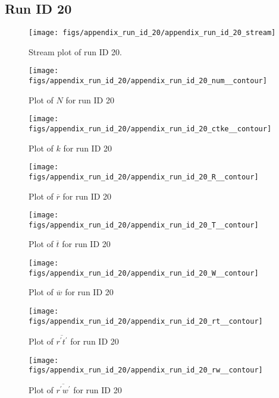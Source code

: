 \subsection{Run ID 20}
\begin{figure}[H]
\centering
\texttt{[image: figs/appendix\_run\_id\_20/appendix\_run\_id\_20\_stream]}
\caption{Stream plot of run ID 20.}
\label{fig:appendix_run_id_20_stream}
\end{figure}


\begin{figure}[H]
\centering
\texttt{[image: figs/appendix\_run\_id\_20/appendix\_run\_id\_20\_num\_\_contour]}
\caption{Plot of $N$ for run ID 20}
\label{fig:appendix_run_id_20_num__contour}
\end{figure}


\begin{figure}[H]
\centering
\texttt{[image: figs/appendix\_run\_id\_20/appendix\_run\_id\_20\_ctke\_\_contour]}
\caption{Plot of $k$ for run ID 20}
\label{fig:appendix_run_id_20_ctke__contour}
\end{figure}


\begin{figure}[H]
\centering
\texttt{[image: figs/appendix\_run\_id\_20/appendix\_run\_id\_20\_R\_\_contour]}
\caption{Plot of $\overline{r}$ for run ID 20}
\label{fig:appendix_run_id_20_R__contour}
\end{figure}


\begin{figure}[H]
\centering
\texttt{[image: figs/appendix\_run\_id\_20/appendix\_run\_id\_20\_T\_\_contour]}
\caption{Plot of $\overline{t}$ for run ID 20}
\label{fig:appendix_run_id_20_T__contour}
\end{figure}


\begin{figure}[H]
\centering
\texttt{[image: figs/appendix\_run\_id\_20/appendix\_run\_id\_20\_W\_\_contour]}
\caption{Plot of $\overline{w}$ for run ID 20}
\label{fig:appendix_run_id_20_W__contour}
\end{figure}


\begin{figure}[H]
\centering
\texttt{[image: figs/appendix\_run\_id\_20/appendix\_run\_id\_20\_rt\_\_contour]}
\caption{Plot of $\overline{r^\prime t^\prime}$ for run ID 20}
\label{fig:appendix_run_id_20_rt__contour}
\end{figure}


\begin{figure}[H]
\centering
\texttt{[image: figs/appendix\_run\_id\_20/appendix\_run\_id\_20\_rw\_\_contour]}
\caption{Plot of $\overline{r^\prime w^\prime}$ for run ID 20}
\label{fig:appendix_run_id_20_rw__contour}
\end{figure}


